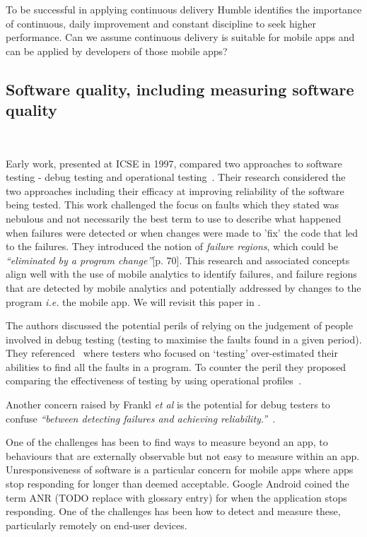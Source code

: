 To be successful in applying continuous delivery Humble identifies the importance of continuous, daily improvement and constant discipline to seek higher performance. Can we assume continuous delivery is suitable for mobile apps and can be applied by developers of those mobile apps? 


\subsection{Software quality, including measuring software quality}~\label{rw-software-quality-including-measurement-topic}

Early work, presented at ICSE in 1997, compared two approaches to software testing - debug testing and operational testing~. Their research considered the two approaches including their efficacy at improving reliability of the software being tested. This work challenged the focus on faults which they stated was nebulous and not necessarily the best term to use to describe what happened when failures were detected or when changes were made to 'fix' the code that led to the failures. They introduced the notion of \emph{failure regions}, which could be \emph{``eliminated by a program change''}[p. 70]. This research and associated concepts align well with the use of mobile analytics to identify failures, and failure regions that are detected by mobile analytics and potentially addressed by changes to the program \emph{i.e.} the mobile app. We will revisit this paper in .

The authors discussed the potential perils of relying on the judgement of people involved in debug testing (testing to maximise the faults found in a given period). They referenced~ where testers who focused on `testing' over-estimated their abilities to find all the faults in a program. To counter the peril they proposed comparing the effectiveness of testing by using operational profiles~.

Another concern raised by Frankl \emph{et al} is the potential for debug testers to confuse \emph{``between detecting failures and achieving reliability.''}~. 


One of the challenges has been to find ways to measure beyond an app, to behaviours that are externally observable but not easy to measure within an app. Unresponsiveness of software is a particular concern for mobile apps where apps stop responding for longer than deemed acceptable. Google Android coined the term ANR (TODO replace with glossary entry) for when the application stops responding. One of the challenges has been how to detect and measure these, particularly remotely on end-user devices. 

